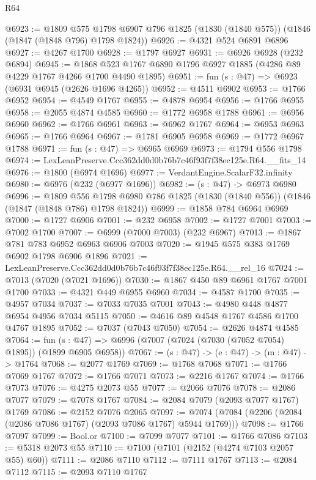 \begin{lexlean}{R64}
\begin{coremodule}
@6923 := @1809
    @575
    @1798
    @6907
    @796
    @1825
    (@1830 (@1840 @575))
    (@1846 (@1847 (@1848 @796) @1798 @1824))
@6926 := @4321 @524 @6891 @6896
@6927 := @4267 @1700
@6928 := @1797 @6927
@6931 := @6926 @6928 (@232 @6894)
@6945 := @1868 @523 @1767 @6890 @1796 @6927 @1885 (@4286 @89 @4229 @1767 @4266 @1700 @4490 @1895)
@6951 := fun (s : @47) => @6923 (@6931 @6945 (@2626 @1696 @4265))
@6952 := @4511 @6902
@6953 := @1766 @6952
@6954 := @4549 @1767
@6955 := @4878 @6954
@6956 := @1766 @6955
@6958 := @2055 @4874 @4585
@6960 := @1772 @6958 @1788
@6961 := @6956 @6960
@6962 := @1766 @6961
@6963 := @6962 @1767
@6964 := @6953 @6963
@6965 := @1766 @6964
@6967 := @1781 @6905 @6958
@6969 := @1772 @6967 @1788
@6971 := fun (s : @47) => @6965 @6969
@6973 := @1794 @556 @1798
@6974 := LexLeanPreserve.Ccc362dd0d0b76b7c46f93f7f38ec125e.R64.__fits_14
@6976 := @1800 (@6974 @1696)
@6977 := VerdantEngine.ScalarF32.infinity
@6980 := @6976 (@232 (@6977 @1696))
@6982 := (s : @47) -> @6973 @6980
@6996 := @1809
    @556
    @1798
    @6980
    @786
    @1825
    (@1830 (@1840 @556))
    (@1846 (@1847 (@1848 @786) @1798 @1824))
@6999 := @1858 @784 @6964 @6969
@7000 := @1727 @6906
@7001 := @232 @6958
@7002 := @1727 @7001
@7003 := @7002 @1700
@7007 := @6999 (@7000 @7003) (@232 @6967)
@7013 := @1867 @781 @783 @6952 @6963 @6906 @7003
@7020 := @1945 @575 @383 @1769 @6902 @1798 @6906 @1896
@7021 := LexLeanPreserve.Ccc362dd0d0b76b7c46f93f7f38ec125e.R64.__rel_16
@7024 := @7013 (@7020 (@7021 @1696))
@7030 := @1867 @450 @89 @6961 @1767 @7001 @1700
@7033 := @4321 @449 @6955 @6960
@7034 := @4587 @1700
@7035 := @4957 @7034
@7037 := @7033 @7035 @7001
@7043 := @4980 @448 @4877 @6954 @4956 @7034 @5115
@7050 := @4616 @89 @4548 @1767 @4586 @1700 @4767 @1895
@7052 := @7037 (@7043 @7050)
@7054 := @2626 @4874 @4585
@7064 := fun (s : @47) => @6996 (@7007 (@7024 (@7030 (@7052 @7054) @1895)) (@1899 @6905 @6958))
@7067 := (s : @47) -> (e : @47) -> (m : @47) -> @1764
@7068 := @2077 @1769
@7069 := @1768 @7068
@7071 := @1766 @7069 @1767
@7072 := @1766 @7071
@7073 := @2216 @1767
@7074 := @1766 @7073
@7076 := @4275 @2073 @55
@7077 := @2066 @7076
@7078 := @2086 @7077
@7079 := @7078 @1767
@7084 := @2084 @7079 (@2093 @7077 @1767) @1769
@7086 := @2152 @7076 @2065
@7097 := @7074 (@7084 (@2206 (@2084 (@2086 @7086 @1767) (@2093 @7086 @1767) @5944 @1769)))
@7098 := @1766 @7097
@7099 := Bool.or
@7100 := @7099 @7077
@7101 := @1766 @7086
@7103 := @5318 @2073 @55
@7110 := @7100 (@7101 (@2152 (@4274 @7103 @2057 @55) @60))
@7111 := @2086 @7110
@7112 := @7111 @1767
@7113 := @2084 @7112
@7115 := @2093 @7110 @1767

\end{coremodule}
\end{lexlean}
